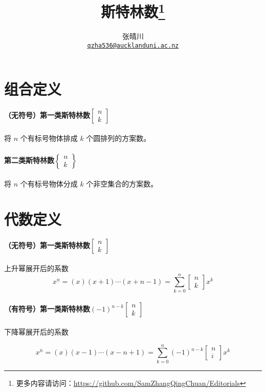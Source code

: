\documentclass{article}
\title{斯特林数\footnote{更多内容请访问：\url{https://github.com/SamZhangQingChuan/Editorials}}}
\author{张晴川\\\href{mailto:qzha536@aucklanduni.ac.nz}{\texttt{qzha536@aucklanduni.ac.nz}}}
\begin{document}
\maketitle


\section{组合定义}

\paragraph{（无符号）第一类斯特林数$\begin{bmatrix}
n\\k
\end{bmatrix}	$}
将 $n$ 个有标号物体排成 $k$ 个圆排列的方案数。

\paragraph{第二类斯特林数$\begin{Bmatrix}n\\k\end{Bmatrix}$}
将 $n$ 个有标号物体分成 $k$ 个非空集合的方案数。


\section{代数定义}

\paragraph{（无符号）第一类斯特林数$\begin{bmatrix}n\\k\end{bmatrix}	$}

上升幂展开后的系数
$$
x^{\underline{n}} =(x)(x+1)\cdots (x+n-1)= \sum_{k = 0}^n \begin{bmatrix}n\\k\end{bmatrix} x^k
$$
\paragraph{（有符号）第一类斯特林数$(-1)^{n-k}\begin{bmatrix}n\\k\end{bmatrix}$}
下降幂展开后的系数

$$
x^{\overline{n}} = (x)(x-1)\cdots (x-n+1)= \sum_{k = 0}^n (-1)^{n-k}\begin{bmatrix}n\\i\end{bmatrix} x^k
$$
\end{document}

